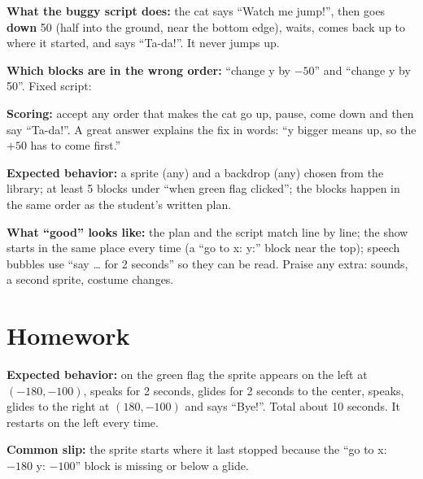 \begin{answer}
\textbf{What the buggy script does:} the cat says \enquote{Watch me jump!}, then goes \textbf{down} 50 (half into the ground, near the bottom edge), waits, comes back up to where it started, and says \enquote{Ta-da!}. It never jumps up.

\textbf{Which blocks are in the wrong order:} \enquote{change y by $-50$} and \enquote{change y by 50}. Fixed script:
\begin{center}
\begin{scratch}[scale=0.85]
\end{scratch}
\end{center}
\textbf{Scoring:} accept any order that makes the cat go up, pause, come down and then say \enquote{Ta-da!}. A great answer explains the fix in words: \enquote{y bigger means up, so the $+50$ has to come first.}
\end{answer}

\begin{answer}
\textbf{Expected behavior:} a sprite (any) and a backdrop (any) chosen from the library; at least 5 blocks under \enquote{when green flag clicked}; the blocks happen in the same order as the student's written plan.

\textbf{What \enquote{good} looks like:} the plan and the script match line by line; the show starts in the same place every time (a \enquote{go to x: y:} block near the top); speech bubbles use \enquote{say \ldots{} for 2 seconds} so they can be read. Praise any extra: sounds, a second sprite, costume changes.
\end{answer}

\section{Homework}
\begin{answer}
\textbf{Expected behavior:} on the green flag the sprite appears on the left at $(-180, -100)$, speaks for 2 seconds, glides for 2 seconds to the center, speaks, glides to the right at $(180, -100)$ and says \enquote{Bye!}. Total about 10 seconds. It restarts on the left every time.

\textbf{Common slip:} the sprite starts where it last stopped because the \enquote{go to x: $-180$ y: $-100$} block is missing or below a glide.
\end{answer}

